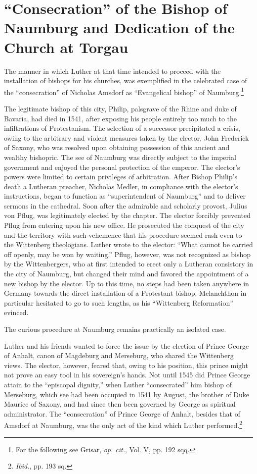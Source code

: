 \section{``Consecration'' of the Bishop of Naumburg and Dedication of the Church at Torgau}

The manner in which Luther at that time intended to proceed with
the installation of bishops for his churches, was exemplified in the
celebrated case of the “consecration” of Nicholas Amsdorf as “Evangelical
bishop” of Naumburg.\footnote
{For the following see Grisar, \textit{op. cit.}, Vol. V, pp. 192 sqq.}

The legitimate bishop of this city, Philip, palsgrave of the Rhine
and duke of Bavaria, had died in 1541, after exposing his people entirely
too much to the infiltrations of Protestanism. The selection of a
successor precipitated a crisis, owing to the arbitrary and violent
measures taken by the elector, John Frederick of Saxony, who was resolved
upon obtaining possession of this ancient and wealthy bishopric. The see
of Naumburg was directly subject to the imperial
government and enjoyed the personal protection of the emperor. The
elector’s powers were limited to certain privileges of arbitration. After
Bishop Philip’s death a Lutheran preacher, Nicholas Medler, in compliance
with the elector’s instructions, began to function as ``superintendent
of Naumburg'' and to deliver sermons in the cathedral.
Soon after the admirable and scholarly provost, Julius von Pflug,
was legitimately elected by the chapter. The elector forcibly prevented
Pflug from entering upon his new office. He prosecuted the
conquest of the city and the territory with such vehemence that his
procedure seemed rash even to the Wittenberg theologians. Luther
wrote to the elector: “What cannot be carried off openly, may be won
by waiting.” Pflug, however, was not recognized as bishop by the
Wittenbergers, who at first intended to erect only a Lutheran consistory
in the city of Naumburg, but changed their mind and favored
the appointment of a new bishop by the elector. Up to this time, no
steps had been taken anywhere in Germany towards the direct installation
of a Protestant bishop. Melanchthon in particular hesitated to go to such
lengths, as his “Wittenberg Reformation” evinced.

The curious procedure at Naumburg remains practically an isolated
case.

Luther and his friends wanted to force the issue by the election
of Prince George of Anhalt, canon of Magdeburg and Merseburg, who
shared the Wittenberg views. The elector, however, feared that, owing
to his position, this prince might not prove an easy tool in his sovereign’s
hands. Not until 1545 did Prince George attain to the “episcopal dignity,”
when Luther “consecrated” him bishop of Merseburg,
which see had been occupied in 1541 by August, the brother of Duke
Maurice of Saxony, and had since then been governed by George as
spiritual administrator. The “consecration” of Prince George of Anhalt,
besides that of Amsdorf at Naumburg, was the only act of the
kind which Luther performed.\footnote{\textit{Ibid.}, pp. 193 sq.}

